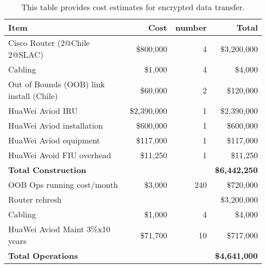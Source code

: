\tiny \begin{longtable} {|l|r|r|r|} \caption{This table provides cost estimates for encrypted data transfer. \label{tab:ipsec}}\\ 
\hline 
\textbf{Item}&\textbf{Cost}&\textbf{number}&\textbf{Total} \\ \hline
{Cisco Router (2@Chile 2@SLAC)}&{\$800,000}&{4}&{\$3,200,000} \\ \hline
{Cabling}&{\$1,000}&{4}&{\$4,000} \\ \hline
{Out of Bounds (OOB) link  install (Chile)}&{\$60,000}&{2}&{\$120,000} \\ \hline
{HuaWei Aviod IRU}&{\$2,390,000}&{1}&{\$2,390,000} \\ \hline
{HuaWei Aviod installation}&{\$600,000}&{1}&{\$600,000} \\ \hline
{HuaWei Aviod equipment}&{\$117,000}&{1}&{\$117,000} \\ \hline
{HuaWei Avoid FIU overhead}&{\$11,250}&{1}&{\$11,250} \\ \hline
\textbf{Total Construction}&\textbf{}&\textbf{}&\textbf{\$6,442,250} \\ \hline
{OOB Ops running cost/month}&{\$3,000}&{240}&{\$720,000} \\ \hline
{Router rehresh}&{}&{ }&{\$3,200,000} \\ \hline
{Cabling}&{\$1,000}&{4}&{\$4,000} \\ \hline
{HuaWei Aviod Maint 3\%x10 years}&{\$71,700}&{10}&{\$717,000} \\ \hline
\textbf{Total Operations}&\textbf{}&\textbf{}&\textbf{\$4,641,000} \\ \hline
\end{longtable} \normalsize
